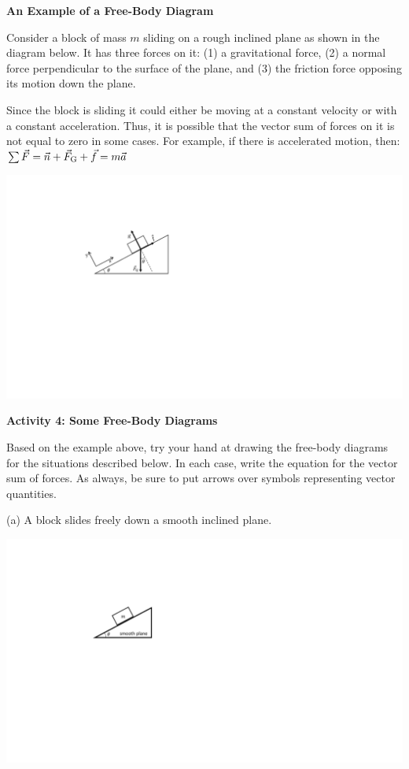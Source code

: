 \pagebreak[2]
\textbf{An Example of a Free-Body Diagram} 

Consider a block of mass $m$ sliding on a rough inclined plane as shown in the
diagram below. It has three forces on it: (1) a gravitational force, (2) a normal
force perpendicular to the surface of the plane, and (3) the friction force
opposing its motion down the plane.

Since the block is sliding it could either be moving at a constant velocity
or with a constant acceleration. Thus, it is possible that the vector sum of
forces on it is not equal to zero in some cases. For example, if there is accelerated
motion, then: \( \sum {\vec F} = {\vec n} + {\vec{F}_{\rm G}} + {\vec f}
= m{\vec a}\)

{\par\centering \includegraphics{friction/force_diagram.pdf} \par}

\bigskip
\textbf{Activity 4: Some Free-Body Diagrams} 

Based on the example above, try your hand at drawing the free-body diagrams for the
situations described below. In each case, write the equation for the vector
sum of forces. As always, be sure to put arrows over symbols representing vector
quantities.

(a) A block slides freely down a smooth inclined plane.

\vspace{0.3cm}
{\par\centering \includegraphics{friction/smooth_plane.pdf} \par}

